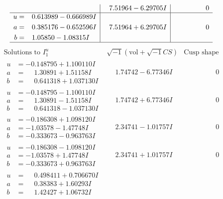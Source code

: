 \documentclass[1p]{elsarticle_modified}
\theoremstyle{definition}
\newcommand{\I}{\sqrt{-1}}
\begin{document}
$$\begin{array}{c|c|c}
 & \phantom{-}7.51964 - 6.29705 I & \phantom{-0.000000 } 0 \\ \hline\begin{aligned}
u &= \phantom{-}0.613989 - 0.666989 I \\
a &= \phantom{-}0.385176 - 0.652596 I \\
b &= \phantom{-}1.05850 - 1.08315 I\end{aligned}
 & \phantom{-}7.51964 + 6.29705 I & \phantom{-0.000000 } 0\\
 \hline 
 \end{array}$$\newpage$$\begin{array}{c|c|c}  
\text{Solutions to }I^u_{1}& \I (\text{vol} + \sqrt{-1}CS) & \text{Cusp shape}\\
 \hline 
\begin{aligned}
u &= -0.148795 + 1.100110 I \\
a &= \phantom{-}1.30891 + 1.51158 I \\
b &= \phantom{-}0.641318 + 1.037130 I\end{aligned}
 & \phantom{-}1.74742 - 6.77346 I & \phantom{-0.000000 } 0 \\ \hline\begin{aligned}
u &= -0.148795 - 1.100110 I \\
a &= \phantom{-}1.30891 - 1.51158 I \\
b &= \phantom{-}0.641318 - 1.037130 I\end{aligned}
 & \phantom{-}1.74742 + 6.77346 I & \phantom{-0.000000 } 0 \\ \hline\begin{aligned}
u &= -0.186308 + 1.098120 I \\
a &= -1.03578 - 1.47748 I \\
b &= -0.333673 - 0.963763 I\end{aligned}
 & \phantom{-}2.34741 - 1.01757 I & \phantom{-0.000000 } 0 \\ \hline\begin{aligned}
u &= -0.186308 - 1.098120 I \\
a &= -1.03578 + 1.47748 I \\
b &= -0.333673 + 0.963763 I\end{aligned}
 & \phantom{-}2.34741 + 1.01757 I & \phantom{-0.000000 } 0 \\ \hline\begin{aligned}
u &= \phantom{-}0.498411 + 0.706670 I \\
a &= \phantom{-}0.38383 + 1.60293 I \\
b &= \phantom{-}1.42427 + 1.06732 I\end{aligned}

\end{array}$$
\end{document}
